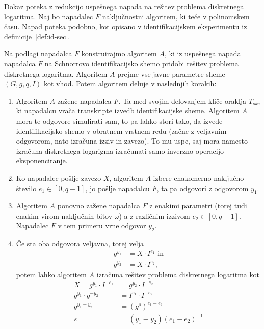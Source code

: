 \documentclass[isrm2, tisk]{fmfdelo}
\begin{document}
\begin{dokaz}
    Dokaz poteka z redukcijo uspešnega napada na rešitev problema diskretnega logaritma. Naj bo napadalec
    $F$ naključnostni algoritem, ki teče v polinomskem času. Napad poteka podobno, kot opisano v
    identifikacijskem eksperimentu iz definicije~\ref{def:id-sec}.


    Na podlagi napadalca $F$ konstruirajmo algoritem $A$, ki iz uspešnega napada napadalca $F$ na
    Schnorrovo identifikacijsko shemo pridobi rešitev problema diskretnega logaritma. Algoritem $A$
    prejme vse javne parametre sheme $(G, g, q, I)$ kot vhod. Potem algoritem deluje v naslednjih
    korakih:
    \begin{enumerate}
        \item Algoritem $A$ zažene napadalca $F$. Ta med svojim delovanjem kliče oraklja $T_{sk}$,
            ki napadalcu vrača transkripte izvedb identifikacijske sheme. Algoritem $A$ mora te
            odgovore simulirati sam, to pa lahko stori tako, da izvede identifikacijsko shemo v
            obratnem vrstnem redu (začne z veljavnim odgovorom, nato izračuna izziv in zavezo). To
            mu uspe, saj mora namesto izračuna diskretnega logarigma izračunati samo inverzno
            operacijo -- eksponenciranje.
        \item Ko napadalec pošlje zavezo $X$, algoritem $A$ izbere enakomerno naključno število $e_1
            \in [0, q - 1]$, jo pošlje napadalcu $F$, ta pa odgovori z odgovorom $y_1$.
        \item Algoritem $A$ ponovno zažene napadalca $F$ z enakimi parametri (torej tudi enakim
            virom naključnih bitov $\omega$) a z različnim izzivom $e_2 \in [0, q - 1]$. Napadalec
            $F$ v tem primeru vrne odgovor $y_2$.
        \item Če sta oba odgovora veljavna, torej velja
            \begin{align*}
                g^{y_1} &= X \cdot I^{e_1} \text{ in} \\
                g^{y_2} &= X \cdot I^{e_2},
            \end{align*}
            potem lahko algoritem $A$ izračuna rešitev problema diskretnega logaritma kot
            \begin{align*}
                X = g^{y_1} \cdot I^{-e_1} &= g^{y_2} \cdot I^{-e_2} \\
                g^{y_1} \cdot g^{-y_2} &= I^{e_1} \cdot I^{-e_2} \\
                g^{y_1 - y_2} &= (g^s)^{e_1 - e_2} \\
                s &= (y_1 - y_2)(e_1 - e_2)^{-1}
            \end{align*}
    \end{enumerate}


\end{dokaz}
\end{document}
